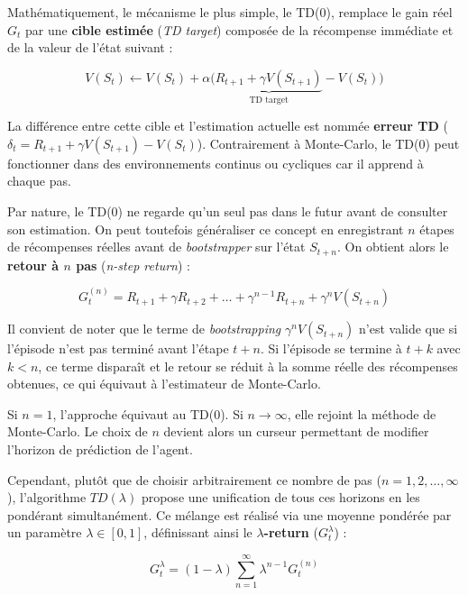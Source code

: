 Mathématiquement, le mécanisme le plus simple, le TD(0), remplace le gain réel $G_t$ par une \textbf{cible estimée} (\textit{TD target}) composée de la récompense immédiate et de la valeur de l'état suivant :

\begin{equation}
    V(S_t) \leftarrow V(S_t) + \alpha \big( \underbrace{R_{t+1} + \gamma V(S_{t+1})}_{\text{TD target}} - V(S_t) \big)
\end{equation}

La différence entre cette cible et l'estimation actuelle est nommée \textbf{erreur TD} ($\delta_t = R_{t+1} + \gamma V(S_{t+1}) - V(S_t)$). Contrairement à Monte-Carlo, le TD(0) peut fonctionner dans des environnements continus ou cycliques car il apprend à chaque pas.

Par nature, le TD(0) ne regarde qu'un seul pas dans le futur avant de consulter son estimation. On peut toutefois généraliser ce concept en enregistrant $n$ étapes de récompenses réelles avant de \textit{bootstrapper} sur l'état $S_{t+n}$. On obtient alors le \textbf{retour à $n$ pas} (\textit{n-step return}) :

\begin{equation}
    G_t^{(n)} = R_{t+1} + \gamma R_{t+2} + \dots + \gamma^{n-1}R_{t+n} + \gamma^nV(S_{t+n})
\end{equation}

\noindent Il convient de noter que le terme de \textit{bootstrapping} $\gamma^n V(S_{t+n})$ n'est valide que si l'épisode n'est pas terminé avant l'étape $t+n$. Si l'épisode se termine à $t+k$ avec $k < n$, ce terme disparaît et le retour se réduit à la somme réelle des récompenses obtenues, ce qui équivaut à l'estimateur de Monte-Carlo.

Si $n=1$, l'approche équivaut au TD(0). Si $n \to \infty$, elle rejoint la méthode de Monte-Carlo. Le choix de $n$ devient alors un curseur permettant de modifier l'horizon de prédiction de l'agent.

Cependant, plutôt que de choisir arbitrairement ce nombre de pas ($n=1, 2, \dots, \infty$), l'algorithme $TD(\lambda)$ propose une unification de tous ces horizons en les pondérant simultanément. Ce mélange est réalisé via une moyenne pondérée par un paramètre $\lambda \in [0, 1]$, définissant ainsi le \textbf{$\lambda$-return} ($G_t^\lambda$) :

\begin{equation}
    G_t^\lambda = (1-\lambda) \sum^\infty_{n=1} \lambda^{n-1}G_t^{(n)}
\end{equation}

